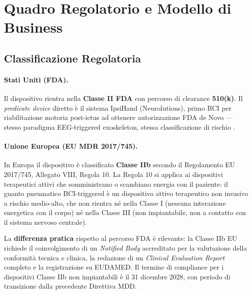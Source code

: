 \documentclass[a4paper,11pt]{article}
\begin{document}
\section{Quadro Regolatorio e Modello di Business}

\subsection{Classificazione Regolatoria}

\paragraph{Stati Uniti (FDA).}
Il dispositivo rientra nella \textbf{Classe II FDA} con percorso di clearance
\textbf{510(k)}. Il \textit{predicate device} diretto è il sistema IpsiHand
(Neurolutions), primo BCI per riabilitazione motoria post-ictus ad ottenere
autorizzazione FDA de Novo — stesso paradigma EEG-triggered exoskeleton,
stessa classificazione di rischio \cite{rustamov2025ipsihand}.

\paragraph{Unione Europea (EU MDR 2017/745).}
In Europa il dispositivo è classificato \textbf{Classe IIb} secondo il
Regolamento EU 2017/745, Allegato VIII, Regola 10. La Regola 10 si applica
ai dispositivi terapeutici attivi che somministrano o scambiano energia con
il paziente: il guanto pneumatico BCI-triggered è un dispositivo attivo
terapeutico non invasivo a rischio medio-alto, che non rientra né nella
Classe I (nessuna interazione energetica con il corpo) né nella Classe III
(non impiantabile, non a contatto con il sistema nervoso centrale).

La \textbf{differenza pratica} rispetto al percorso FDA è rilevante:
la Classe IIb EU richiede il coinvolgimento di un \textit{Notified Body}
accreditato per la valutazione della conformità tecnica e clinica, la
redazione di un \textit{Clinical Evaluation Report} completo e la
registrazione su EUDAMED. Il termine di compliance per i dispositivi
Classe IIb non impiantabili è il 31 dicembre 2028, con periodo di transizione
dalla precedente Direttiva MDD.
\end{document}
